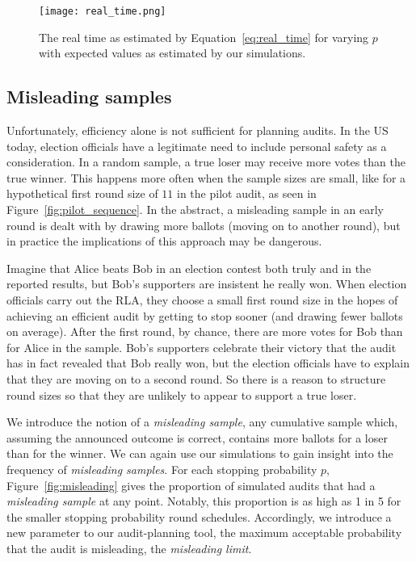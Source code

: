 \begin{figure}
\texttt{[image: real\_time.png]}
\caption{The real time as estimated by Equation~\ref{eq:real_time} for varying $p$ with expected values as estimated by our simulations.}
\label{fig:real_time}
\end{figure}


\subsection{Misleading samples}

Unfortunately, efficiency alone is not sufficient for planning audits. In the US today, election officials have a legitimate need to include personal safety as a consideration.
In a random sample, a true loser may receive more votes than the true winner. This happens more often when the sample sizes are small, like for a hypothetical first round size of $11$ in the pilot audit, as seen in Figure~\ref{fig:pilot_sequence}.
In the abstract, a misleading sample in an early round is dealt with by drawing more ballots (moving on to another round), but in practice the implications of this approach may be dangerous.

Imagine that Alice beats Bob in an election contest both truly and in the reported results, but Bob's supporters are insistent he really won. When election officials carry out the RLA, they choose a small first round size in the hopes of achieving an efficient audit by getting to stop sooner (and drawing fewer ballots on average). 
After the first round, by chance, there are more votes for Bob than for Alice in the sample. Bob's supporters celebrate their victory that the audit has in fact revealed that Bob really won, but the election officials have to explain that they are moving on to a second round. 
So there is a reason to structure round sizes so that they are unlikely to appear to support a true loser.


We introduce the notion of a \emph{misleading sample}, any cumulative sample which, assuming the announced outcome is correct, contains more ballots for a loser than for the winner.
We can again use our simulations to gain insight into the frequency of \emph{misleading samples}.
For each stopping probability $p$, Figure~\ref{fig:misleading} gives the proportion of simulated audits that had a \emph{misleading sample} at any point. 
Notably, this proportion is as high as 1 in 5 for the smaller stopping probability round schedules.
Accordingly, we introduce a new parameter to our audit-planning tool, the maximum acceptable probability that the audit is misleading, the \emph{misleading limit}.


